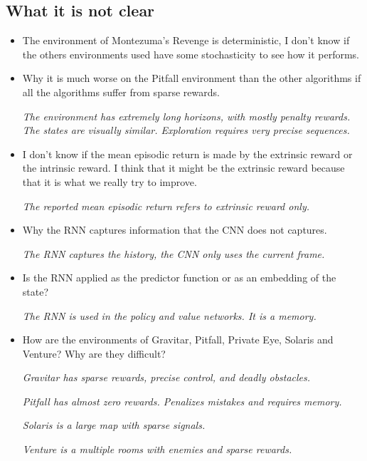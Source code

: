 \documentclass[11pt,a4paper]{article}
\begin{document}
\subsection{What it is not clear} 
\begin{itemize}
    \item The environment of Montezuma's Revenge is deterministic, I don't know if the others environments used have some stochasticity to see how it performs. 
    
    \item Why it is much worse on the Pitfall environment than the other algorithms if all the algorithms suffer from sparse rewards.

    \textit{The environment has extremely long horizons, with mostly penalty rewards. The states are visually similar. Exploration requires very precise sequences.}

    \item I don't know if the mean episodic return is made by the extrinsic reward or the intrinsic reward. I think that it might be the extrinsic reward because that it is what we really try to improve. 

    \textit{The reported mean episodic return refers to extrinsic reward only.}

    \item Why the RNN captures information that the CNN does not captures. 

    \textit{The RNN captures the history, the CNN only uses the current frame.}

    \item Is the RNN applied as the predictor function or as an embedding of the state?

    \textit{The RNN is used in the policy and value networks. It is a memory.}

    \item How are the environments of Gravitar, Pitfall, Private Eye, Solaris and Venture? Why are they difficult? 

    \textit{Gravitar has sparse rewards, precise control, and deadly obstacles.} 
    
    \textit{Pitfall has almost zero rewards. Penalizes mistakes and requires memory.}
    
    \textit{Solaris is a large map with sparse signals.}

    \textit{Venture is a multiple rooms with enemies and sparse rewards.}

\end{itemize}
\end{document}
